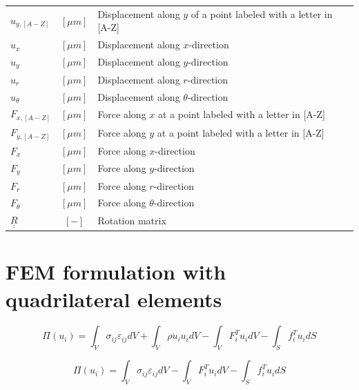 \documentclass[a4paper]{jpconf}
\begin{document}
\begin{tabular}{lcl}
$u_{y,[A-Z]}$ & $\left[\mu m\right]$  & Displacement along $y$ of a point labeled with a letter in [A-Z]\\
$u_{x}$ & $\left[\mu m\right]$  & Displacement along $x$-direction\\
$u_{y}$ & $\left[\mu m\right]$  & Displacement along $y$-direction\\
$u_{r}$ & $\left[\mu m\right]$  & Displacement along $r$-direction\\
$u_{\theta}$ & $\left[\mu m\right]$  & Displacement along $\theta$-direction\\
$F_{x,[A-Z]}$ & $\left[\mu m\right]$  & Force along $x$ at a point labeled with a letter in [A-Z]\\
$F_{y,[A-Z]}$ & $\left[\mu m\right]$  & Force along $y$ at a point labeled with a letter in [A-Z]\\
$F_{x}$ & $\left[\mu m\right]$  & Force along $x$-direction\\
$F_{y}$ & $\left[\mu m\right]$  & Force along $y$-direction\\
$F_{r}$ & $\left[\mu m\right]$  & Force along $r$-direction\\
$F_{\theta}$ & $\left[\mu m\right]$  & Force along $\theta$-direction\\
$\underline{\underline{R}}$ & $\left[-\right]$  & Rotation matrix\\
\end{tabular}

\clearpage
\section{ FEM formulation with quadrilateral elements}

\begin{equation}
\Pi\left(u_{i}\right)=\int_{V}\sigma_{ij}\varepsilon_{ij}dV+\int_{V}\rho\ddot{u}_{i}u_{i}dV-\int_{V}F^{T}_{i}u_{i}dV-\int_{S}f^{T}_{i}u_{i}dS
\end{equation}

\begin{equation}
\Pi\left(u_{i}\right)=\int_{V}\sigma_{ij}\varepsilon_{ij}dV-\int_{V}F^{T}_{i}u_{i}dV-\int_{S}f^{T}_{i}u_{i}dS
\end{equation}
\end{document}
